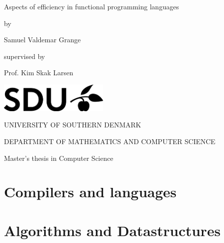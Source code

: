 \documentclass[11pt,oneside,a4paper]{report}
\theoremstyle{plain}
\theoremstyle{case}
\theoremstyle{definition}
\begin{document}
\begin{titlepage}
	\begin{center}
		\vspace*{1cm}
		\huge{Aspects of efficiency in functional programming languages}

		\vspace*{0.5cm}
		\large{by}

		\vspace{0.5cm}
		\Large{Samuel Valdemar Grange}

		\vspace*{0.5cm}
		\normalsize{supervised by}

		\vspace{0.5cm}
		\large{Prof. Kim Skak Larsen}

		\vfill

		\vspace*{0.7cm}
		\includegraphics[width=0.4\textwidth]{sdulogo}

		\vspace*{1cm}
		\MakeUppercase{University of southern Denmark}

		\vspace*{0.3cm}
		\MakeUppercase{Department of mathematics and computer science}

		\vspace*{0.3cm}
		\large{Master's thesis in Computer Science}
	\end{center}

\end{titlepage}

\tableofcontents

\part{Compilers and languages}







\part{Algorithms and Datastructures}



{}



\end{document}
